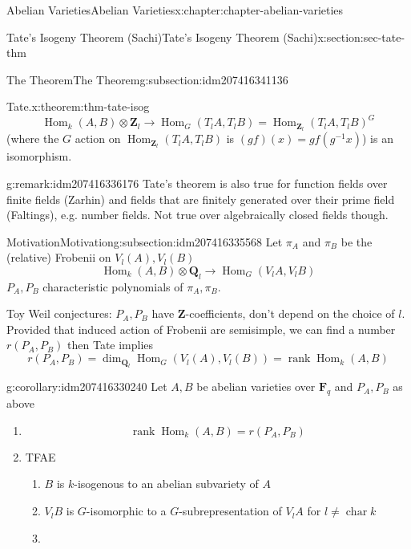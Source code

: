 \documentclass[oneside,10pt,]{book}
\numberwithin{equation}{section}
\newcommand{\ZZ}{\mathbf{Z}}
\newcommand{\QQ}{\mathbf{Q}}
\newcommand{\FF}{\mathbf{F}}
\DeclareMathOperator{\Hom}{Hom}
\DeclareMathOperator{\rank}{rank}
\DeclareMathOperator{\characteristic}{char}
\begin{document}
\begin{chapterptx}{Abelian Varieties}{}{Abelian Varieties}{}{}{x:chapter:chapter-abelian-varieties}
\begin{sectionptx}{Tate's Isogeny Theorem (Sachi)}{}{Tate's Isogeny Theorem (Sachi)}{}{}{x:section:sec-tate-thm}
\begin{subsectionptx}{The Theorem}{}{The Theorem}{}{}{g:subsection:idm207416341136}
\begin{theorem}{Tate.}{}{x:theorem:thm-tate-isog}
\begin{equation*}
\Hom_{k}(A,B)\otimes \ZZ_l \to \Hom_G(T_l A, T_lB) = \Hom_{\ZZ_l}(T_lA,T_lB)^G
\end{equation*}
(where the \(G\) action on \(\Hom_{\ZZ_l}(T_l A, T_lB)\) is \((gf)(x) = gf(g^{-1}x)\)) is an isomorphism.%
\end{theorem}
\begin{remark}{}{g:remark:idm207416336176}%
Tate's theorem is also true for function fields over finite fields (Zarhin) and fields that are finitely generated over their prime field (Faltings), e.g. number fields. Not true over algebraically closed fields though.%
\end{remark}
\end{subsectionptx}
%
%
\typeout{************************************************}
\typeout{************************************************}
%
\begin{subsectionptx}{Motivation}{}{Motivation}{}{}{g:subsection:idm207416335568}
Let \(\pi_A\) and \(\pi_B\) be the (relative) Frobenii on \(V_l(A), V_l(B)\)%
\begin{equation*}
\Hom_{k}(A,B)\otimes \QQ_l \to \Hom_G(V_l A, V_lB)
\end{equation*}
\(P_A,P_B\) characteristic polynomials of \(\pi_A,\pi_B\).%
\par
Toy Weil conjectures: \(P_A, P_B\) have \(\ZZ\)-coefficients, don't depend on the choice of \(l\). Provided that induced action of Frobenii are semisimple, we can find a number \(r(P_A,P_B)\) then Tate implies%
\begin{equation*}
r(P_A,P_B) = \dim_{\QQ_l} \Hom_G (V_l(A), V_l(B)) = \rank \Hom_k(A,B)
\end{equation*}
%
\begin{corollary}{}{}{g:corollary:idm207416330240}%
Let \(A, B\) be abelian varieties over \(\FF_q\) and \(P_A, P_B\) as above%
\begin{enumerate}
\item{}%
\begin{equation*}
\rank \Hom_k(A,B) = r(P_A,P_B)
\end{equation*}
%
\item{}TFAE%
\begin{enumerate}
\item{}\(B\) is \(k\)-isogenous to an abelian subvariety of \(A\)%
\item{}\(V_lB\) is \(G\)-isomorphic to a \(G\)-subrepresentation of \(V_lA\) for \(l \ne \characteristic k\)%
\item{}%

\end{enumerate}
\end{enumerate}
\end{corollary}
\end{subsectionptx}
\end{sectionptx}
\end{chapterptx}
\end{document}
